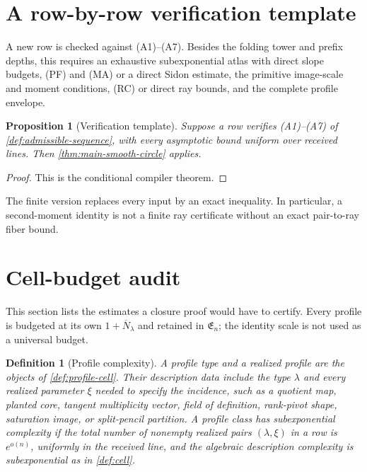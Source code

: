 \documentclass[12pt,a4paper]{amsart}
\numberwithin{equation}{section}
\newtheorem{proposition}[proposition]{Proposition}
\newtheorem{definition}[definition]{Definition}
\theoremstyle{remark}
\newcommand{\barN}{\overline N}
\begin{document}
\section{A row-by-row verification template}\label{sec:verification-template}

A new row is checked against \textup{(A1)}--\textup{(A7)}.  Besides the
folding tower and prefix depths, this requires an exhaustive
subexponential atlas with direct slope budgets, \textup{(PF)} and
\textup{(MA)} or a direct Sidon estimate, the primitive image-scale and
moment conditions, \textup{(RC)} or direct ray bounds, and the complete
profile envelope.

\begin{proposition}[Verification template]\label{prop:verification-template}
Suppose a row verifies \textup{(A1)}--\textup{(A7)} of
\cref{def:admissible-sequence}, with every asymptotic bound uniform over
received lines.  Then \cref{thm:main-smooth-circle} applies.
\end{proposition}

\begin{proof}
This is the conditional compiler theorem.
\end{proof}

The finite version replaces every input by an exact inequality.  In
particular, a second-moment identity is not a finite ray certificate without
an exact pair-to-ray fiber bound.

\section{Cell-budget audit}\label{sec:complete-cell-budgets}

This section lists the estimates a closure proof would have to certify.
Every profile is budgeted at its own \(1+\barN_\lambda\) and retained in
\(\mathfrak E_n\); the identity scale is not used as a universal budget.

\begin{definition}[Profile complexity]\label{def:profile-complexity}
A profile type and a realized profile are the objects of
\cref{def:profile-cell}.  Their description data include the type
\(\lambda\) and every realized parameter \(\xi\) needed to specify the
incidence, such as a quotient map, planted core, tangent multiplicity
vector, field of definition, rank-pivot shape, saturation image, or
split-pencil partition.  A profile class has subexponential complexity if
the total number of nonempty realized pairs \((\lambda,\xi)\) in a row is
\(e^{o(n)}\), uniformly in the received line, and the algebraic description
complexity is subexponential as in \cref{def:cell}.
\end{definition}
\end{document}
